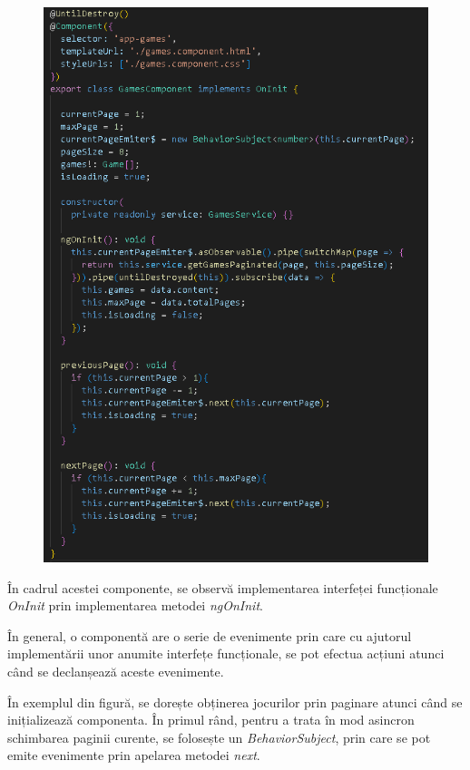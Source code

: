 \documentclass[12pt,a4paper]{report}
\begin{document}
\begin{figure}[H]
\centering
\caption{}
\begin{adjustbox}{max size={\textwidth}{\textheight}}
\includegraphics[scale=0.6]{exemplu_33_subscribe}
\end{adjustbox}

\caption*{}
\end{figure}

În cadrul acestei componente, se observă implementarea interfeței funcționale \emph{OnInit} prin implementarea metodei \emph{ngOnInit}. 

În general, o componentă are o serie de evenimente prin care cu ajutorul implementării unor anumite interfețe funcționale, se pot efectua acțiuni atunci când se declanșează aceste evenimente.  \cite{34}

În exemplul din figură, se dorește obținerea jocurilor prin paginare atunci când se inițializează componenta. În primul rând, pentru a trata în mod asincron schimbarea paginii curente, se folosește un \emph{BehaviorSubject}, prin care se pot emite evenimente prin apelarea metodei \emph{next}.
\end{document}
